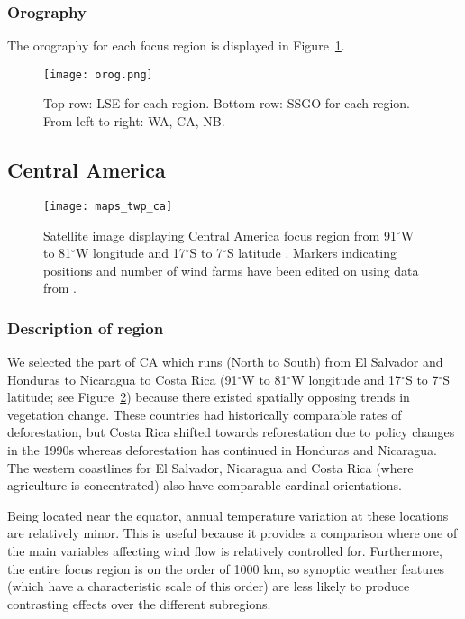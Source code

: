 \subsubsection{Orography}

The orography for each focus region is displayed in Figure~\ref{fig:orog}.

\begin{figure}[!ht]
	\centering
	\texttt{[image: orog.png]}
	\caption[Orography for all focus regions]{Top row: \acf{LSE} for each region. Bottom row: \acf{SSGO} for each region. From left to right: \acl{WA}, \acl{CA}, \acl{NB}.}
	\label{fig:orog}
\end{figure}

\subsection{Central America}

\begin{figure}[!ht]
	\centering
	\texttt{[image: maps\_twp\_ca]}
	\caption[Central America Map]{Satellite image displaying Central America focus region from 91$^\circ$W to 81$^\circ$W longitude and 17$^\circ$S to 7$^\circ$S latitude \citep{maps_ca}. Markers indicating positions and number of wind farms have been edited on using data from \citep{twp_hd, twp_nc, twp_cr}.}
	\label{fig:maps_twp_ca}
\end{figure}

\subsubsection{Description of region}

We selected the part of \ac{CA} which runs (North to South) from El Salvador and Honduras to Nicaragua to Costa Rica (91$^\circ$W to 81$^\circ$W longitude and 17$^\circ$S to 7$^\circ$S latitude; see Figure~\ref{fig:maps_twp_ca}) because there existed spatially opposing trends in vegetation change. These countries had historically comparable rates of deforestation, but Costa Rica shifted towards reforestation due to policy changes in the 1990s whereas deforestation has continued in Honduras and Nicaragua. The western coastlines for El Salvador, Nicaragua and Costa Rica (where agriculture is concentrated) also have comparable cardinal orientations.

Being located near the equator, annual temperature variation at these locations are relatively minor. This is useful because it provides a comparison where one of the main variables affecting wind flow is relatively controlled for. Furthermore, the entire focus region is on the order of 1000 km, so synoptic weather features (which have a characteristic scale of this order) are less likely to produce contrasting effects over the different subregions.

